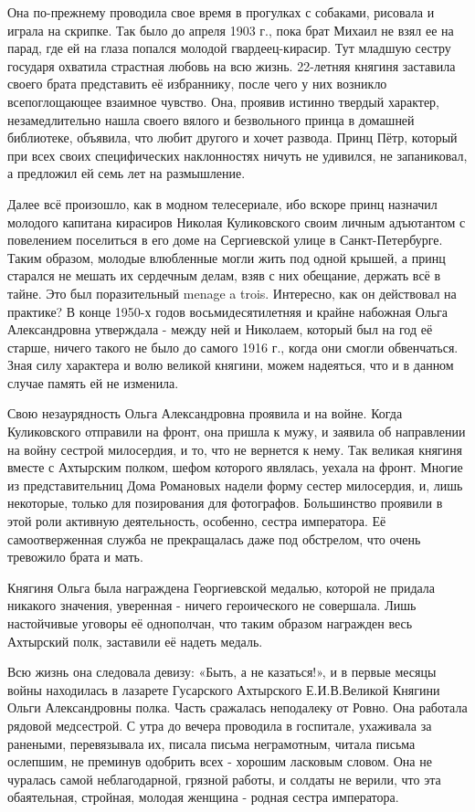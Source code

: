 Она по-прежнему проводила свое время в прогулках
с собаками, рисовала и играла на скрипке. Так было до апреля 1903 г., пока брат
Михаил не взял ее на парад, где ей на глаза попался молодой гвардеец-кирасир.
Тут младшую сестру государя охватила страстная любовь на всю жизнь. 22-летняя
княгиня заставила своего брата представить её избраннику, после чего у них
возникло всепоглощающее взаимное чувство. Она, проявив истинно твердый
характер, незамедлительно нашла своего вялого и безвольного принца в домашней
библиотеке, объявила, что любит другого и хочет развода. Принц Пётр, который
при всех своих специфических наклонностях ничуть не удивился, не запаниковал, а
предложил ей семь лет на размышление. 

Далее всё произошло, как в модном
телесериале, ибо вскоре принц назначил молодого капитана кирасиров Николая
Куликовского своим личным адъютантом с повелением поселиться в его доме на
Сергиевской улице в Санкт-Петербурге. Таким образом, молодые влюбленные могли
жить под одной крышей, а принц старался не мешать их сердечным делам, взяв с
них обещание, держать всё в тайне. Это был поразительный menage a trois.
Интересно, как он действовал на практике? В конце 1950-х годов
восьмидесятилетняя и крайне набожная Ольга Александровна утверждала - между ней
и Николаем, который был на год её старше, ничего такого не было до самого 1916
г., когда они смогли обвенчаться. Зная силу характера и волю великой княгини,
можем надеяться, что и в данном случае память ей не изменила.

Свою незаурядность Ольга Александровна проявила и на войне. Когда Куликовского
отправили на фронт, она пришла к мужу, и заявила об направлении на войну
сестрой милосердия, и то, что не вернется к нему. Так великая княгиня вместе с
Ахтырским полком, шефом которого являлась, уехала на фронт. Многие из
представительниц Дома Романовых надели форму сестер милосердия, и, лишь
некоторые, только для позирования для фотографов. Большинство проявили в этой
роли активную деятельность, особенно, сестра императора. Её самоотверженная
служба не прекращалась даже под обстрелом, что очень тревожило брата и мать.

Княгиня Ольга была награждена Георгиевской медалью, которой не придала никакого
значения, уверенная - ничего героического не совершала. Лишь настойчивые
уговоры её однополчан, что таким образом награжден весь Ахтырский полк,
заставили её надеть медаль. 

Всю жизнь она следовала девизу: «Быть, а не
казаться!», и в первые месяцы войны находилась в лазарете Гусарского Ахтырского
Е.И.В.Великой Княгини Ольги Александровны полка. Часть сражалась неподалеку от
Ровно. Она работала рядовой медсестрой. С утра до вечера проводила в госпитале,
ухаживала за ранеными, перевязывала их, писала письма неграмотным, читала
письма ослепшим, не преминув одобрить всех - хорошим ласковым словом. Она не
чуралась самой неблагодарной, грязной работы, и солдаты не верили, что эта
обаятельная, стройная, молодая женщина - родная сестра императора.

